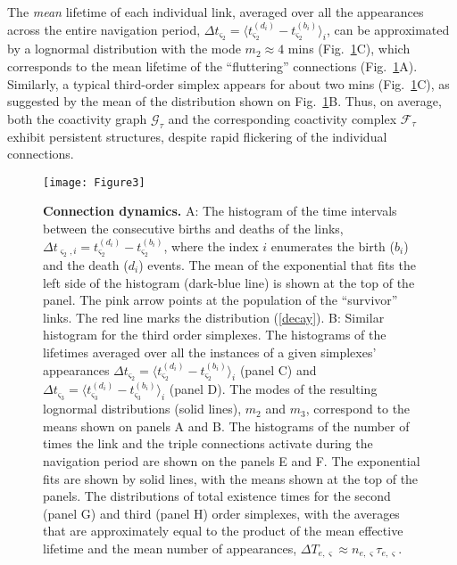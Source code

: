 \documentclass[12pt,tightenlines]{revtex4}
\begin{document}
The \emph{mean} lifetime of each individual link, averaged over all the appearances across the entire navigation period, 
$\Delta t_{\varsigma_2} = \langle t^{(d_i)}_{\varsigma_2} - t^{(b_i)}_{\varsigma_2} \rangle_i$, can be approximated by 
a lognormal distribution with the mode $m_2 \approx 4$ mins (Fig.~\ref{Figure3}C), which corresponds to the mean lifetime 
of the ``fluttering'' connections (Fig.~\ref{Figure3}A). Similarly, a typical third-order simplex appears for about two mins 
(Fig.~\ref{Figure3}C), as suggested by the mean of the distribution shown on Fig.~\ref{Figure3}B. Thus, on average, both 
the coactivity graph $\mathcal{G}_{\tau}$ and the corresponding coactivity complex $\mathcal{F}_{\tau}$ exhibit 
persistent structures, despite rapid flickering of the individual connections.

\begin{figure}[!h]
\texttt{[image: Figure3]}
\caption{{\footnotesize\textbf{Connection dynamics.} A: The histogram of the time intervals between the consecutive births and deaths 
of the links, $\Delta t_{\varsigma_2,i} = t^{(d_i)}_{\varsigma_2} - t^{(b_i)}_{\varsigma_2}$, where the index $i$ 
enumerates the birth ($b_i$) and the death ($d_i$) events. The mean of the exponential that fits the left side of the 
histogram (dark-blue line) is shown at the top of the panel. The pink arrow points at the population of the ``survivor'' links. 
The red line marks the distribution (\ref{decay}). 
B: Similar histogram for the third order simplexes. The histograms of the lifetimes averaged over all the instances of a 
given simplexes' appearances $\Delta t_{\varsigma_2} = \langle t^{(d_i)}_{\varsigma_2} - t^{(b_i)}_{\varsigma_2}\rangle_i$ 
(panel C) and $\Delta t_{\varsigma_3} = \langle t^{(d_i)}_{\varsigma_3} - t^{(b_i)}_{\varsigma_3}\rangle_i$ (panel D). 
The modes of the resulting lognormal distributions (solid lines), $m_2$ and $m_3$, correspond to the means shown on 
panels A and B. The histograms of the number of times the link and the triple connections activate during the navigation 
period are shown on the panels E and F. The exponential fits are shown by solid lines, with the means shown at the top 
of the panels. The distributions of total existence times for the second (panel G) and third (panel H) order simplexes, with 
the averages that are approximately equal to the product of the mean effective lifetime and the mean number of appearances, 
$\Delta T_{e,\varsigma}\approx n_{e,\varsigma}\tau_{e,\varsigma}$.}}
\label{Figure3}
\end{figure}
\end{document}
